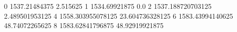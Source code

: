 0 1537.21484375 2.515625
1 1534.69921875 0.0
2 1537.188720703125 2.489501953125
4 1558.303955078125 23.604736328125
6 1583.43994140625 48.74072265625
8 1583.62841796875 48.92919921875
